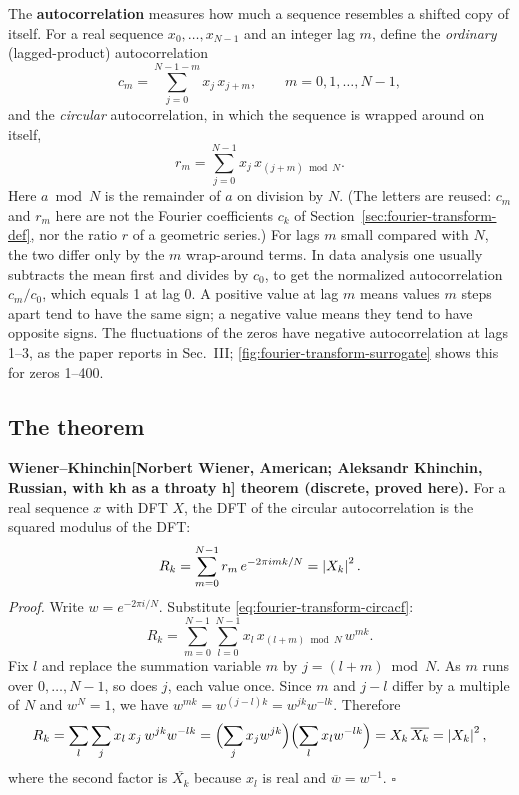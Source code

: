The \textbf{autocorrelation} measures how much a sequence resembles a shifted copy of itself. For a real sequence $x_0,\dots,x_{N-1}$ and an integer lag $m$, define the \emph{ordinary} (lagged-product) autocorrelation
\begin{equation}
c_m=\sum_{j=0}^{N-1-m}x_j\,x_{j+m},\qquad m=0,1,\dots,N-1,
\label{eq:fourier-transform-acf}
\end{equation}
and the \emph{circular} autocorrelation, in which the sequence is wrapped around on itself,
\begin{equation}
r_m=\sum_{j=0}^{N-1}x_j\,x_{(j+m)\bmod N}.
\label{eq:fourier-transform-circacf}
\end{equation}
Here $a\bmod N$ is the remainder of $a$ on division by $N$. (The letters are reused: $c_m$ and $r_m$ here are not the Fourier coefficients $c_k$ of Section~\ref{sec:fourier-transform-def}, nor the ratio $r$ of a geometric series.) For lags $m$ small compared with $N$, the two differ only by the $m$ wrap-around terms. In data analysis one usually subtracts the mean first and divides by $c_0$, to get the normalized autocorrelation $c_m/c_0$, which equals 1 at lag 0. A positive value at lag $m$ means values $m$ steps apart tend to have the same sign; a negative value means they tend to have opposite signs. The fluctuations of the zeros have negative autocorrelation at lags 1--3, as the paper reports in Sec.~III; \cref{fig:fourier-transform-surrogate} shows this for zeros 1--400.

\subsection{The theorem}

\textbf{Wiener--Khinchin[Norbert Wiener, American; Aleksandr Khinchin, Russian, with kh as a throaty h] theorem (discrete, proved here).} For a real sequence $x$ with DFT $X$, the DFT of the circular autocorrelation is the squared modulus of the DFT:
\begin{equation}
R_k=\sum_{m=0}^{N-1}r_m\,e^{-2\pi imk/N}=\left\lvert X_k\right\rvert^2 .
\label{eq:fourier-transform-wk}
\end{equation}
\emph{Proof.} Write $w=e^{-2\pi i/N}$. Substitute \eqref{eq:fourier-transform-circacf}:
\[R_k=\sum_{m=0}^{N-1}\sum_{l=0}^{N-1}x_l\,x_{(l+m)\bmod N}\,w^{mk}.\]
Fix $l$ and replace the summation variable $m$ by $j=(l+m)\bmod N$. As $m$ runs over $0,\dots,N-1$, so does $j$, each value once. Since $m$ and $j-l$ differ by a multiple of $N$ and $w^N=1$, we have $w^{mk}=w^{(j-l)k}=w^{jk}w^{-lk}$. Therefore
\[R_k=\sum_{l}\sum_{j}x_l\,x_j\,w^{jk}w^{-lk}=\Bigl(\sum_jx_jw^{jk}\Bigr)\Bigl(\sum_lx_lw^{-lk}\Bigr)=X_k\,\overline{X_k}=\left\lvert X_k\right\rvert^2,\]
where the second factor is $\overline{X_k}$ because $x_l$ is real and $\overline{w}=w^{-1}$. $\square$


